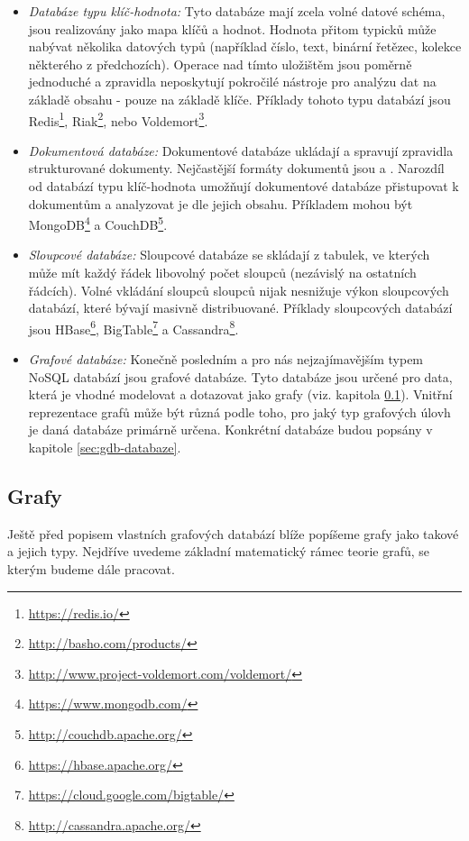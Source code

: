 \begin{itemize}
  \item{\textit{Databáze typu klíč-hodnota:}} Tyto databáze mají zcela volné datové schéma, jsou realizovány jako mapa klíčů a hodnot. Hodnota přitom typicků může nabývat několika datových typů (například číslo, text, binární řetězec, kolekce některého z předchozích). Operace nad tímto uložištěm jsou poměrně jednoduché a zpravidla neposkytují pokročilé nástroje pro analýzu dat na základě obsahu - pouze na základě klíče. Příklady tohoto typu databází jsou Redis\footnote{\url{https://redis.io/}}, Riak\footnote{\url{http://basho.com/products/}}, nebo Voldemort\footnote{\url{http://www.project-voldemort.com/voldemort/}}.
  \item{\textit{Dokumentová databáze:}} Dokumentové databáze ukládají a spravují zpravidla strukturované dokumenty. Nejčastější formáty dokumentů jsou \textit{} a \textit{}. Narozdíl od databází typu klíč-hodnota umožňují dokumentové databáze přistupovat k dokumentům a analyzovat je dle jejich obsahu. Příkladem mohou být MongoDB\footnote{\url{https://www.mongodb.com/}} a CouchDB\footnote{\url{http://couchdb.apache.org/}}.
  \item{\textit{Sloupcové databáze:}} Sloupcové databáze se skládají z tabulek, ve kterých může mít každý řádek libovolný počet sloupců (nezávislý na ostatních řádcích). Volné vkládání sloupců sloupců nijak nesnižuje výkon sloupcových databází, které bývají masivně distribuované. Příklady sloupcových databází jsou HBase\footnote{\url{https://hbase.apache.org/}}, BigTable\footnote{\url{https://cloud.google.com/bigtable/}} a Cassandra\footnote{\url{http://cassandra.apache.org/}}.
  \item{\textit{Grafové databáze:}} Konečně posledním a pro nás nejzajímavějším typem NoSQL databází jsou grafové databáze. Tyto databáze jsou určené pro data, která je vhodné modelovat a dotazovat jako grafy (viz. kapitola \ref{sec:gdb-grafy}). Vnitřní reprezentace grafů může být různá podle toho, pro jaký typ grafových úlovh je daná databáze primárně určena. Konkrétní databáze budou popsány v kapitole \ref{sec:gdb-databaze}.
\end{itemize}


\subsection{Grafy}
\label{sec:gdb-grafy}
Ještě před popisem vlastních grafových databází blíže popíšeme grafy jako takové a jejich typy. Nejdříve uvedeme základní matematický rámec teorie grafů, se kterým budeme dále pracovat.

